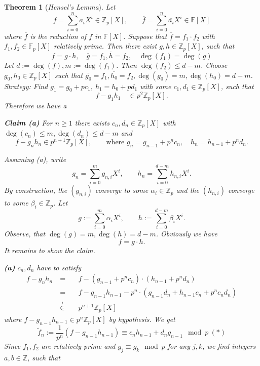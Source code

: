 \documentclass[11pt]{book}
\newtheorem{theorem}{Theorem}[section]
\theoremstyle{nonumberbreak}
\newenvironment{pr}[1][]{\ifthenelse{\equal{#1}{}}{\proof}{\proof[#1]}\rm}{\endproof}
\begin{document}
\begin{spacing}{1.3}
\begin{theorem}[\rm \it Hensel's Lemma]
Let 
$$f= \sum_{i=0}^n a_i X^{i} \in \mathbb{Z}_p[X], \qquad \overline{f}=\sum_{i=0}^n \overline{a_i} X^{i} \in \mathbb{F}[X]$$
where $\overline{f}$ is the reduction of $f$ in $\mathbb{F}[X]$.
Suppose that $\overline{f}=f_1 \cdot f_2$ with $f_1, f_2 \in \mathbb{F}_p[X]$ relatively prime.
Then there exist $g,h \in \mathbb{Z}_p[X]$, such that 
$$f= g \cdot h, \quad \overline{g}=f_1, \overline{h}=f_2, \quad \deg(f_1)=\deg(g)$$
\begin{pr}
Let $d:= \deg(f), m:= \deg(f_1)$. Then $\deg(f_2) \leqslant d-m$.
Choose $g_0, h_0 \in \mathbb{Z}_p[X]$ such that $\overline{g_0}=f_1, \overline{h_0}=f_2, \deg(g_0)=m, \deg(h_0)=d-m$.
\textit{Strategy:} Find $g_1=g_0+pc_1$, $h_1=h_0+pd_1$ with some $c_1, d_1 \in \mathbb{Z}_p[X]$, such that 
$$f-g_1h_1 \quad \in p^2 \mathbb{Z}_p[X].$$
Therefore we have a 
\begin{compactenum}
\item[\textbf{Claim (a)}] For $n \geqslant 1 $ there exists $c_n, d_n \in \mathbb{Z}_p[X]$ with $\deg(c_n) \leqslant m, \deg(d_n) \leqslant d-m$ and 
$$f-g_nh_n \in p^{n+1} \mathbb{Z}_p[X], \qquad \textrm{where } g_n= g_{n-1}+p^n c_n , \quad h_n=h_{n-1}+p^nd_n.$$
\end{compactenum}
Assuming (a), write
$$g_n= \sum_{i=0}^m g_{n,i} X^{i}, \qquad h_n= \sum_{i=0}^{d-m} h_{n,i} X^{i}.$$
By construction, the $(g_{n,i})$ converge to some $\alpha_i \in \mathbb{Z}_p$ and the $(h_{n,i})$ converge to some $\beta_i \in \mathbb{Z}_p$. Let 
$$g:=\sum_{i=0}^m \alpha_i X^{i}, \qquad h:=\sum_{i=0}^{d-m} \beta_i X^{i}.$$
Observe, that $\deg(g)=m, \deg(h)=d-m$. Obviously we have $$f=g \cdot h.$$
It remains to show the claim.
\begin{compactenum}
\item[\textbf{(a)}] $c_n, d_n$ have to satisfy
\begin{alignat*}{5}
f-g_nh_n \ &=&& \ f-\left(g_{n-1}+p^n c_n\right)\cdot \left(h_{n-1}+p^nd_n\right)\\
&=&& \ f- g_{n-1}h_{n-1} - p^n \cdot \left( g_{n-1}d_n+h_{n-1}c_n + p^n c_n d_n \right)\\
&\overset{!}{\in}&& \ p^{n+1} \mathbb{Z}_p[X]
\end{alignat*}
where $f-g_{n-1}h_{n-1} \in p^n \mathbb{Z}_p[X]$ by hypothesis. We get 
$$\tilde{f}_n := \frac{1}{p^n} (f-g_{n-1}h_{n-1}) \equiv c_n h_{n-1} + d_n g_{n-1} \mod p \ (*)$$
Since $f_1, f_2$ are relatively prime and $g_j \equiv g_k \mod p$ for any $j,k$, we find integers $a,b \in \mathbb{Z}$, such that

\end{compactenum}
\end{pr}
\end{theorem}
\end{spacing}
\end{document}
